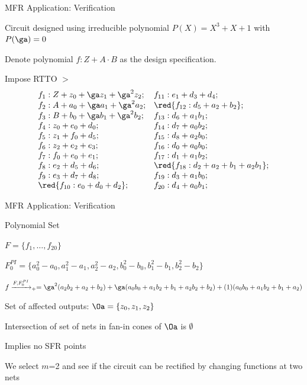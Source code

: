 \begin{frame}{\large MFR Application: Verification}
\bi
	\item Circuit designed using irreducible polynomial $P(X) = X^3+X+1$ with $P(\ga)=0$
	\item Denote polynomial $f: Z + A\cdot B$ as the design specification.
	\item Impose RTTO $>$
	\[ \begin{array}{ll}%
f_1:Z + z_0 +\ga z_1 + \ga^2 z_2;   & f_{11}:e_1 + d_3 + d_4; \\       
f_2:A + a_0 +\ga a_1 + \ga^2 a_2;   & \red{f_{12}:d_5 + a_2 + b_2}; \\
f_3:B + b_0 +\ga b_1 + \ga^2 b_2;   & f_{13}:d_6 + a_1b_1; \\          
f_4:z_0 + e_0 + d_0;                & f_{14}:d_7 + a_0b_2; \\          
f_5:z_1 + f_0 + d_5;                & f_{15}:d_8 + a_2b_0; \\          
f_6:z_2 + e_2 + e_3;         & f_{16}:d_0 + a_0b_0; \\
f_7:f_0 + e_0 + e_1;         & f_{17}:d_1 + a_1b_2; \\
f_8:e_2 + d_5 + d_6;         & \red{f_{18}:d_2 + a_2 + b_1 + a_2b_1}; \\
f_9:e_3 + d_7 + d_8;         & f_{19}:d_3 + a_1b_0; \\
\red{f_{10}:e_0 + d_0 + d_2};&    f_{20}:d_4 + a_0b_1;   \\
\end{array}\]%
\ei
\end{frame}

\begin{frame}{\large MFR Application: Verification}
\bi
	\item Polynomial Set
	\bi
		\item $F = \{f_1,\dots,f_{20}\}$ 
		\item $F_0^{PI} = \{a_0^2-a_0, a_1^2-a_1,a_2^2-a_2,b_0^2-b_0, b_1^2-b_1,b_2^2-b_2\}$
	\ei
	\vspace{0.1in}
	\item $f\xrightarrow{F,F_{0}^{PI}}_+= \ga^2(a_2b_2+a_2+b_2)+\ga(a_0b_0+a_1b_2+b_1+a_2b_2+b_2) + (1)(a_0b_0+a_1b_2+b_1+a_2)$
	\vspace{0.1in}
	\item Set of affected outputs: $\Oa = \{z_0,z_1,z_2\}$
	\vspace{0.1in}
	\item Intersection of set of nets in fan-in cones of $\Oa$ is $\emptyset$
	\bi
		\item Implies no SFR points
	\ei
	\vspace{0.1in}
	\item We select $m$=2 and see if the circuit can be rectified by changing
	functions at two nets
\ei
\end{frame}

